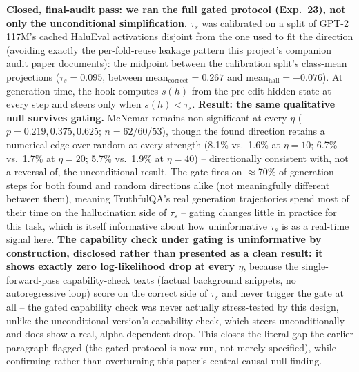 \documentclass[onecolumn]{jmlr}
\begin{document}
\textbf{Closed, final-audit pass: we ran the full gated protocol
(Exp.~23), not only the unconditional simplification.} $\tau_s$ was
calibrated on a split of GPT-2 117M's cached HaluEval activations
disjoint from the one used to fit the direction (avoiding exactly the
per-fold-reuse leakage pattern this project's companion audit paper
documents): the midpoint between the calibration split's class-mean
projections ($\tau_s=0.095$, between mean$_{\text{correct}}=0.267$ and
mean$_{\text{hall}}=-0.076$). At generation time, the hook computes
$s(h)$ from the pre-edit hidden state at every step and steers only
when $s(h)<\tau_s$. \textbf{Result: the same qualitative null survives
gating.} McNemar remains non-significant at every $\eta$ ($p=0.219,
0.375, 0.625$; $n=62/60/53$), though the found direction retains a
numerical edge over random at every strength (8.1\% vs.\ 1.6\% at
$\eta=10$; 6.7\% vs.\ 1.7\% at $\eta=20$; 5.7\% vs.\ 1.9\% at
$\eta=40$) -- directionally consistent with, not a reversal of, the
unconditional result. The gate fires on $\approx$70\% of generation
steps for both found and random directions alike (not meaningfully
different between them), meaning TruthfulQA's real generation
trajectories spend most of their time on the hallucination side of
$\tau_s$ -- gating changes little in practice for this task, which is
itself informative about how uninformative $\tau_s$ is as a real-time
signal here. \textbf{The capability check under gating is
uninformative by construction, disclosed rather than presented as a
clean result: it shows exactly zero log-likelihood drop at every
$\eta$}, because the single-forward-pass capability-check texts
(factual background snippets, no autoregressive loop) score on the
correct side of $\tau_s$ and never trigger the gate at all -- the
gated capability check was never actually stress-tested by this
design, unlike the unconditional version's capability check, which
steers unconditionally and does show a real, alpha-dependent drop.
This closes the literal gap the earlier paragraph flagged (the gated
protocol is now run, not merely specified), while confirming rather
than overturning this paper's central causal-null finding.
\end{document}
